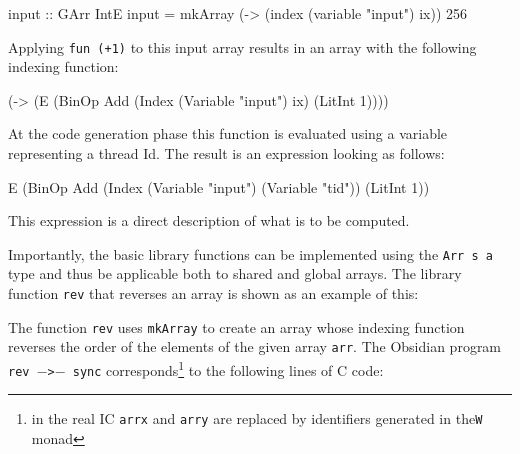 \begin{code}
input :: GArr IntE 
input = mkArray (\ix -> (index (variable "input") ix)) 256
\end{code}

Applying {\tt fun (+1)} to this input array results in an array with the 
following indexing function:
\begin {code}
(\ix -> (E (BinOp Add (Index (Variable "input") ix) (LitInt 1)))) 
\end{code} 

At the code generation phase this function is evaluated using a variable 
representing a thread Id. The result is an expression looking as follows:
\begin {code}
E (BinOp Add (Index (Variable "input") (Variable "tid")) (LitInt 1))
\end{code} 

This expression is a direct description of what is to be computed. 



Importantly, the basic library functions can be implemented using the 
{\tt Arr s a} type and thus be applicable both to shared and global arrays.
The library function {\tt rev} that reverses an array is shown as an example
of this: 

The function {\tt rev} uses {\tt mkArray} to create an array whose indexing 
function reverses the order of the elements of the given array {\tt arr}. 
The Obsidian program {\tt rev $-$>$-$ sync} 
corresponds\footnote{in the real IC {\tt arrx} and {\tt arry} are replaced by identifiers generated in the{\tt W} monad}
to the following lines of C code:
 
